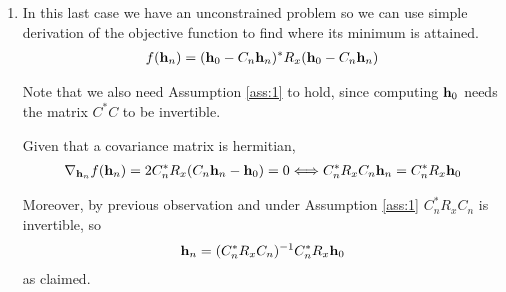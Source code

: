 \documentclass{article}
\begin{document}
\begin{enumerate}[label=(\roman*)]
        \item In this last case we have an unconstrained problem so we can use simple derivation of the objective function to find where its minimum is attained.
        \begin{align}
            f(\mathbf{h}_n) = (\mathbf{h}_0 - C_n \mathbf{h}_n )^* R_x (\mathbf{h}_0 - C_n \mathbf{h}_n )
        \end{align}
        
        Note that we also need Assumption \ref{ass:1} to hold, since computing $\mathbf{h}_0$ needs the matrix $C^* C$ to be invertible.
        
        Given that a covariance matrix is hermitian,
        \begin{align}
            \nabla_{\mathbf{h}_n} f(\mathbf{h}_n) = 2 C_n^* R_x (C_n \mathbf{h}_n - \mathbf{h}_0) = 0 \Longleftrightarrow C_n^* R_x C_n \mathbf{h}_n =  C_n^* R_x \mathbf{h}_0
        \end{align}
        
        Moreover, by previous observation and under Assumption \ref{ass:1} $C_n^* R_x C_n$ is invertible, so
        \begin{align}
            \mathbf{h}_n = (C_n^* R_x C_n)^{-1} C_n^* R_x \mathbf{h}_0
        \end{align}
        as claimed.
    \end{enumerate}
\end{document}
